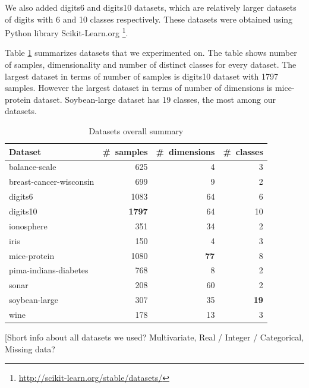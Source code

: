\documentclass[12pt,a4paper]{report}
\begin{document}
We also added digits6 and digits10 datasets, which are relatively larger datasets of digits with 6 and 10 classes respectively. These datasets were obtained using Python library Scikit-Learn.org \footnote{\url{http://scikit-learn.org/stable/datasets/}}.

Table \ref{tab:datasets} summarizes datasets that we experimented on. The table shows number of samples, dimensionality and number of distinct classes for every dataset. The largest dataset in terms of number of samples is digits10 dataset with 1797 samples. However the largest dataset in terms of number of dimensions is mice-protein dataset. Soybean-large dataset has 19 classes, the most among our datasets.

\begin{table}[ht] \centering
\begin{tabular}{lrrr}
\hline
Dataset & \#~samples & \#~dimensions & \#~classes \\
\hline
balance-scale           & 625   & 4    & 3  \\
breast-cancer-wisconsin & 699   & 9    & 2  \\
digits6                 & 1083  & 64   & 6  \\
digits10                & \textbf{1797}  & 64   & 10 \\
ionosphere              & 351   & 34   & 2  \\
iris                    & 150   & 4    & 3  \\
mice-protein            & 1080  & \textbf{77}   & 8  \\
pima-indians-diabetes   & 768   & 8    & 2  \\
sonar                   & 208   & 60   & 2  \\
soybean-large           & 307   & 35   & \textbf{19} \\
wine                    & 178   & 13   & 3  \\
\hline
\end{tabular}
\caption{Datasets overall summary} \label{tab:datasets}
\end{table}

[Short info about all datasets we used? Multivariate, Real / Integer / Categorical, Missing data? %
\end{document}
